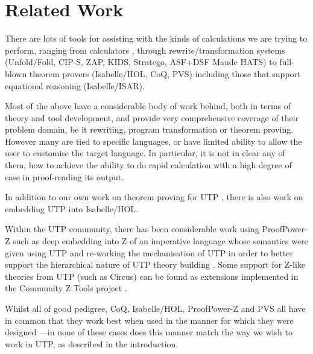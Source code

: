 \section{Related Work}\label{sec:Related}

There are lots of tools for assisting with the kinds of
calculations we are trying to perform,
ranging from calculators
\cite{Bird14},
through rewrite/transformation
systems
(Unfold/Fold\cite{BurstallAndDarlington77},
CIP-S\cite{DBLP:books/sp/BauerEH87},
ZAP\cite{Feather:1982:SAP:357153.357154},
KIDS\cite{Smith91},
Stratego\cite{conf/rta/Visser01},
ASF+DSF\cite{VanDenBrand:2002:CLD}
Maude\cite{conf/rta/ClavelDELMMT03}
HATS\cite{conf/gttse/WinterB06})
to full-blown theorem provers
(Isabelle/HOL\cite{books/sp/NipkowPW02},
CoQ\cite{bk:Coq'Art:04},
PVS\cite{conf/fmcad/Shankar96})
including those that support equational reasoning
(Isabelle/ISAR\cite{man:Isabelle:Isar:Wenzel:10}).

Most of the above have a considerable body of work behind,
both in terms of theory and tool development,
and provide very comprehensive coverage of their problem domain,
be it rewriting, program transformation or theorem proving.
However many are tied to specific languages,
or have limited ability to allow the user to customise the target language.
In particular,
it is not in clear any of them,
how to achieve the ability to do rapid calculation
with a high degree of ease in proof-reading its
output.

In addition to our own work on theorem proving for UTP \cite{conf/utp/Butterfield10},
there is also work on embedding UTP into Isabelle/HOL\cite{DBLP:conf/utp/FosterZW14}.

Within the UTP community,
there has been considerable work using Proof{\-}Power-Z
such as deep embedding into Z of an imperative language whose semantics
were given using UTP \cite{conf/utp/NukaW06}and
 re-working the mechanisation of UTP in order to better support
the hierarchical nature of UTP theory building \cite{journals/entcs/ZeydaC09}.
Some support for Z-like theories from UTP (such as Circus)
can be found as extensions implemented in the Community Z Tools project
\cite{conf/zum/MalikU05}.

Whilst all of good pedigree, CoQ, Isabelle/HOL, ProofPower-Z and PVS
all have in common that they work best when used in the manner
for which they were designed%
---in none of these cases does this manner match the way
we wish to work in UTP, as described in the introduction.




